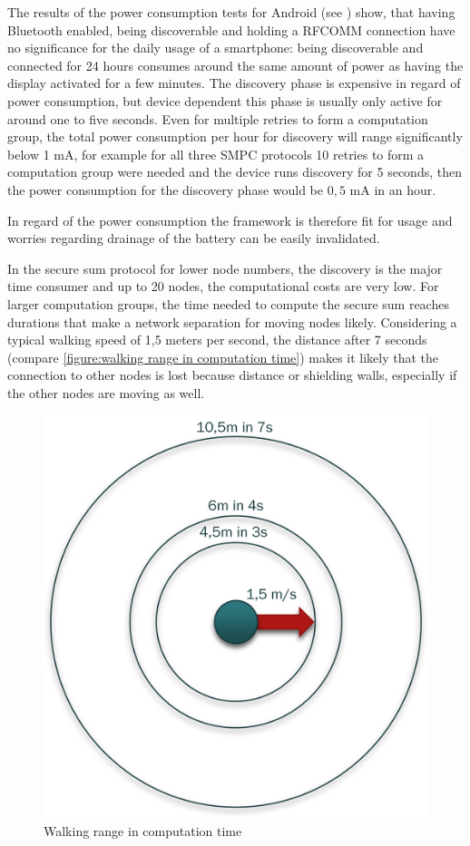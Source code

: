 The results of the power consumption tests for Android (see ) show, that having Bluetooth enabled, being discoverable and holding a \gls{RFCOMM} connection have no significance for the daily usage of a smartphone: being discoverable and connected for 24 hours consumes around the same amount of power as having the display activated for a few minutes. The discovery phase is expensive in regard of power consumption, but device dependent this phase is usually only active for around one to five seconds. Even for multiple retries to form a computation group, the total power consumption per hour for discovery will range significantly below 1 mA, for example for all three \gls{SMPC} protocols 10 retries to form a computation group were needed and the device runs discovery for 5 seconds, then the power consumption for the discovery phase would be $0,5$ mA in an hour. 

In regard of the power consumption the framework is therefore fit for usage and worries regarding drainage of the battery can be easily invalidated.

In the secure sum protocol for lower node numbers, the discovery is the major time consumer and up to 20 nodes, the computational costs are very low. For larger computation groups, the time needed to compute the secure sum reaches durations that make a network separation for moving nodes likely. Considering a typical walking speed of 1,5 meters per second, the distance after 7 seconds (compare \autoref{figure:walking range in computation time}) makes it likely that the connection to other nodes is lost because distance or shielding walls, especially if the other nodes are moving as well.

\begin{figure}[!htbp] %
	\caption{Walking range in computation time} \label{figure:walking range in computation time}
	\includegraphics[scale=1.0]{figures/walking_range.png}
\end{figure}

